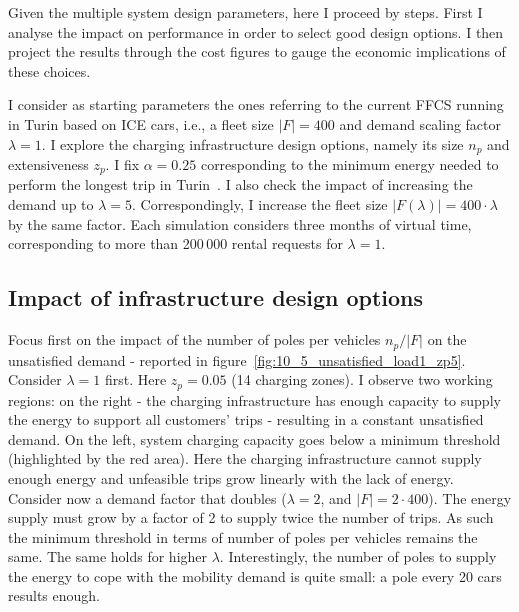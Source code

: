 Given the multiple system design parameters, here I proceed by steps. First I analyse the impact on performance in order to select good design options. I then project the results through the cost figures to gauge the economic implications of these choices.

I consider as starting parameters the ones referring to the current FFCS running in Turin based on ICE cars, i.e., a fleet size $|F|=400$ and demand scaling factor $\lambda=1$. I explore the charging infrastructure design options, namely its size $n_p$ and extensiveness $z_p$. I fix $\alpha=0.25$ corresponding to the minimum energy needed to perform the longest trip in Turin~\cite{7_cocca2019free}.
I also check the impact of increasing the demand up to $\lambda=5$. Correspondingly, I increase the fleet size $|F(\lambda)|=400\cdot \lambda$ by the same factor. Each simulation considers three months of virtual time, corresponding to more than 200\,000 rental requests for $\lambda=1$.

\subsection{Impact of infrastructure design options}

Focus first on the impact of the number of poles per vehicles $n_p/|F|$ on the unsatisfied demand - reported in figure~\ref{fig:10_5_unsatisfied_load1_zp5}. Consider $\lambda=1$ first. Here $z_p=0.05$ (14 charging zones). I observe two working regions: on the right - the charging infrastructure has enough capacity to supply the energy to support all customers' trips - resulting in a constant unsatisfied demand. On the left, system charging capacity goes below a minimum threshold (highlighted by the red area). Here the charging infrastructure cannot supply enough energy and unfeasible trips grow linearly with the lack of energy.
Consider now a demand factor that doubles ($\lambda=2$, and $|F|=2\cdot 400$). The energy supply must grow by a factor of 2 to supply twice the number of trips. As such the minimum threshold in terms of number of poles per vehicles remains the same. The same holds for higher $\lambda$.
Interestingly, the number of poles to supply the energy to cope with the mobility demand is quite small: a pole every 20 cars results enough.

